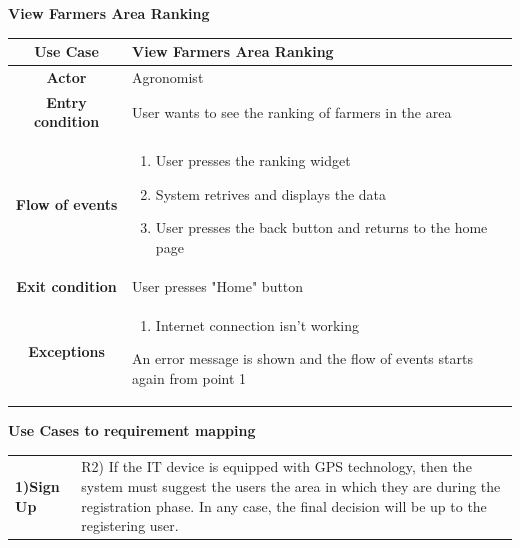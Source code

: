 \documentclass[table, 12pt]{article}
\begin{document}
\begin{itemize}
            \begin{table}[H]
                \item[] \textbf{View Farmers Area Ranking}
                \item[] 
                \centering
                \begin{tabular}{|c |m{}|}
                    \hline
                    \textbf{Use Case} & View Farmers Area Ranking\\ \hline
                    \textbf{Actor} & Agronomist\\ \hline
                    \textbf{Entry condition} & User wants to see the ranking of farmers in the area\\  \hline
                    \textbf{Flow of events} & \begin{enumerate}
                                                \item User presses the ranking widget 
                                                \item System retrives and displays the data
                                                \item User presses the back button and returns to the home page
                                            \end{enumerate}\\ \hline
                    \textbf{Exit condition} & User presses "Home" button\\ \hline
                    \textbf{Exceptions} & \begin{enumerate}
                        \item Internet connection isn't working
                    \end{enumerate}
                    An error message is shown and the flow of events starts again from point 1\\ \hline                    
                \end{tabular}
            \end{table}
            
        
        \newpage

        \item \textbf{Use Cases to requirement mapping}
        
        \item[] \begin{longtable}{|p{}|p{}|}
                    \hline
                    \cellcolor{SpringGreen!50}\textbf{1)Sign Up}\centering & R2) If the IT device is equipped with GPS technology, then the system must suggest the users the area in which they are during the registration phase. In any case, the final decision will be up to the registering user.


\end{longtable}
\end{itemize}
\end{document}
